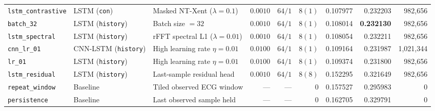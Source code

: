 \documentclass[11pt,a4paper]{article}
\begin{document}
\begin{table}[H]
{\begin{tabular}{lllrrrrrr}
\texttt{lstm\_contrastive} & LSTM (\texttt{con}) & Masked NT-Xent ($\lambda=0.1$) & $0.0010$ & $64 / 1$ & $8 (1)$ & 0.107977 & 0.232203 & 982,656 \\
\texttt{batch\_32} & LSTM (\texttt{history}) & Batch size $= 32$ & $0.0010$ & $64 / 1$ & $8 (1)$ & 0.108014 & \textbf{0.232130} & 982,656 \\
\texttt{lstm\_spectral} & LSTM (\texttt{history}) & rFFT spectral L1 ($\lambda=0.01$) & $0.0010$ & $64 / 1$ & $8 (1)$ & 0.108054 & 0.232211 & 982,656 \\
\texttt{cnn\_lr\_01} & CNN-LSTM (\texttt{history}) & High learning rate $\eta = 0.01$ & $0.0100$ & $64 / 1$ & $8 (1)$ & 0.109164 & 0.231987 & 1,021,344 \\
\texttt{lr\_01} & LSTM (\texttt{history}) & High learning rate $\eta = 0.01$ & $0.0100$ & $64 / 1$ & $8 (1)$ & 0.109374 & 0.231800 & 982,656 \\
\texttt{lstm\_residual} & LSTM (\texttt{history}) & Last-sample residual head & $0.0010$ & $64 / 1$ & $8 (8)$ & 0.152295 & 0.321649 & 982,656 \\
\texttt{repeat\_window} & Baseline & Tiled observed ECG window & --- & --- & 0 & 0.157527 & 0.295983 & 0 \\
\texttt{persistence} & Baseline & Last observed sample held & --- & --- & 0 & 0.162705 & 0.329791 & 0 \\
\bottomrule
\end{tabular}}
\end{table}

\begin{table}[H]
\centering
\caption{Target-aligned observation window length controls (\texttt{outputs/research\_100hz\_dev/context\_comparison.csv}).}
\label{tab:context_aligned}
\small
{}
\end{table}
\end{document}
